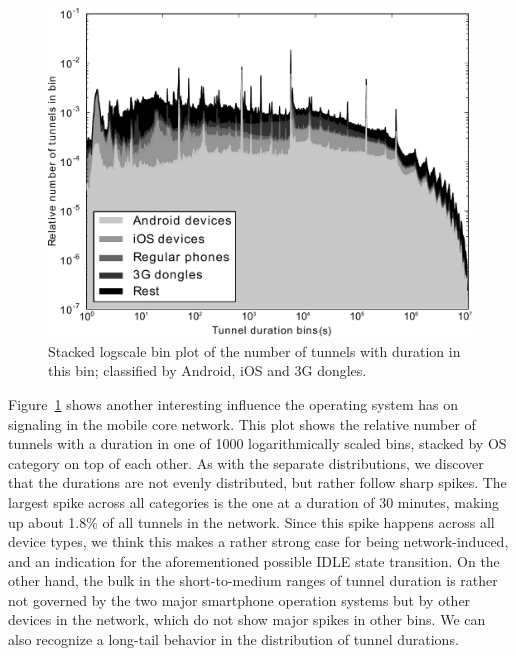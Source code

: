 \begin{figure}[htbp]
	\centering
	\includegraphics[width=1.0\textwidth]{images/stacked-durations-2-fixed.pdf}
	\caption{Stacked logscale bin plot of the number of tunnels with duration in this bin; classified by Android, iOS and 3G dongles.}
	\label{c4:fig:stacked-durations}
\end{figure}

Figure~\ref{c4:fig:stacked-durations} shows another interesting influence the operating system has on signaling in the mobile core network. This plot shows the relative number of tunnels with a duration in one of 1000 logarithmically scaled bins, stacked by OS category on top of each other. As with the separate distributions, we discover that the durations are not evenly distributed, but rather follow sharp spikes. The largest spike across all categories is the one at a duration of 30 minutes, making up about 1.8\% of all tunnels in the network. Since this spike happens across all device types, we think this makes a rather strong case for being network-induced, and an indication for the aforementioned possible IDLE state transition. On the other hand, the bulk in the short-to-medium ranges of tunnel duration is rather not governed by the two major smartphone operation systems but by other devices in the network, which do not show major spikes in other bins. We can also recognize a long-tail behavior in the distribution of tunnel durations.


